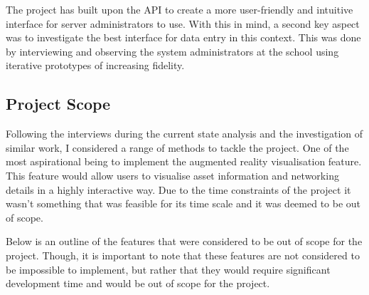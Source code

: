 \documentclass [11pt,a4paper]{article}
\begin{document}
The project has built upon the API to create a more user-friendly and intuitive interface for server administrators to use. With this in mind, a second key aspect was to investigate the best interface for data entry in this context. This was done by interviewing and observing the system administrators at the school using iterative prototypes of increasing fidelity.

\subsection{Project Scope}
\label{sec:stretchgoals}

Following the interviews during the current state analysis and the investigation of similar work, I considered a range of methods to tackle the project. One of the most aspirational being to implement the augmented reality visualisation feature. This feature would allow users to visualise asset information and networking details in a highly interactive way. Due to the time constraints of the project it wasn't something that was feasible for its time scale and it was deemed to be out of scope. 

Below is an outline of the features that were considered to be out of scope for the project. Though, it is important to note that these features are not considered to be impossible to implement, but rather that they would require significant development time and would be out of scope for the project.
\end{document}
